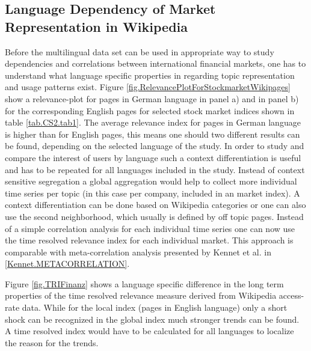 \documentclass[a4paper,10pt]{scrbook}
\begin{document}
\subsection{Language Dependency of Market Representation in Wikipedia}
Before the multilingual data set can be used in appropriate way to study dependencies and correlations between international financial markets, one has to understand what language specific properties in regarding topic representation and usage patterns exist. Figure \ref{fig.RelevancePlotForStockmarketWikipages} show a relevance-plot for pages in German language in panel a) and in panel b) for the corresponding English pages for selected stock market indices shown in table \ref{tab.CS2.tab1}. The average relevance index for pages in German language is higher than for English pages, this means one should two different results can be found, depending on the selected language of the study. In order to study and compare the interest of users by language such a context differentiation is useful and has to be repeated for all languages included in the study. Instead of context sensitive segregation a global aggregation would help to collect more individual time series per topic (in this case per company, included in an market index). A context differentiation can be done based on Wikipedia categories or one can also use the second neighborhood, which usually is defined by off topic pages. Instead of a simple correlation analysis for each individual time series one can now use the time resolved relevance index for each individual market. This approach is comparable with meta-correlation analysis presented by Kennet et al. in \ref{Kennet.METACORRELATION}.



\label{ext.fig.RelevancePlotForStockmarketWikipages} 





Figure \ref{fig.TRIFinanz} shows a language specific difference in the long term properties of the time resolved relevance measure derived from Wikipedia access-rate data. While for the local index (pages in English language) only a short shock can be recognized in the global index much stronger trends can be found. A time resolved index would have to be calculated for all languages to localize the reason for the trends. 
 
\end{document}
